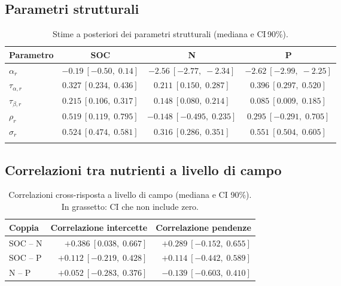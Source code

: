 \documentclass[11pt, a4paper]{article}
\newcommand{\CI}[2]{[#1,\;#2]}
\newcommand{\tauA}[1]{\tau_{\alpha,#1}}
\newcommand{\tauB}[1]{\tau_{\beta,#1}}
\begin{document}

\subsection{Parametri strutturali}

\begin{table}[htbp]
\centering
\caption{Stime a posteriori dei parametri strutturali
(mediana e CI\,90\%).}
\label{tab:main}
\small
\begin{tabular}{@{}lccc@{}}
\toprule
Parametro & SOC & N & P \\
\midrule

$\alpha_r$ &
$-0.19\ \CI{-0.50}{0.14}$ &
$\mathbf{-2.56}\ \CI{-2.77}{-2.34}$ &
$\mathbf{-2.62}\ \CI{-2.99}{-2.25}$ \\[2pt]

$\tauA{r}$ &
$\mathbf{0.327}\ \CI{0.234}{0.436}$ &
$\mathbf{0.211}\ \CI{0.150}{0.287}$ &
$\mathbf{0.396}\ \CI{0.297}{0.520}$ \\[2pt]

$\tauB{r}$ &
$\mathbf{0.215}\ \CI{0.106}{0.317}$ &
$\mathbf{0.148}\ \CI{0.080}{0.214}$ &
$\mathbf{0.085}\ \CI{0.009}{0.185}$ \\[2pt]

$\rho_r$ &
$\mathbf{0.519}\ \CI{0.119}{0.795}$ &
$-0.148\ \CI{-0.495}{0.235}$ &
$0.295\ \CI{-0.291}{0.705}$ \\[2pt]

$\sigma_r$ &
$\mathbf{0.524}\ \CI{0.474}{0.581}$ &
$\mathbf{0.316}\ \CI{0.286}{0.351}$ &
$\mathbf{0.551}\ \CI{0.504}{0.605}$ \\

\bottomrule
\\

\end{tabular}
\end{table}


\subsection{Correlazioni tra nutrienti a livello di campo}

\begin{table}[htbp]
\centering
\caption{Correlazioni cross-risposta a livello di campo (mediana e CI 90\%).
  In grassetto: CI che non include zero.}
\label{tab:cross_corr}
\small
\begin{tabular}{@{}lrr@{}}
\toprule
Coppia & Correlazione intercette & Correlazione pendenze \\
\midrule

SOC -- N &
$\mathbf{+0.386}\ \CI{0.038}{0.667}$ &
$+0.289\ \CI{-0.152}{0.655}$ \\[2pt]

SOC -- P &
$+0.112\ \CI{-0.219}{0.428}$ &
$+0.114\ \CI{-0.442}{0.589}$ \\[2pt]

N -- P &
$+0.052\ \CI{-0.283}{0.376}$ &
$-0.139\ \CI{-0.603}{0.410}$ \\

\bottomrule
\end{tabular}
\end{table}
\end{document}
